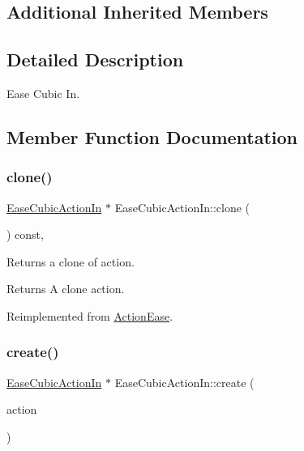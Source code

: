 \subsection*{Additional Inherited Members}


\subsection{Detailed Description}
Ease Cubic In. 

\subsection{Member Function Documentation}
\mbox{\label{classEaseCubicActionIn_a710f732cc78c6ef8d4697d4bd0021b3e}} 
\subsubsection{\texorpdfstring{clone()}{clone()}}
{\footnotesize\ttfamily \hyperlink{classEaseCubicActionIn}{Ease\+Cubic\+Action\+In} $\ast$ Ease\+Cubic\+Action\+In\+::clone (\begin{DoxyParamCaption}\item[{void}]{ }\end{DoxyParamCaption}) const\hspace{0.3cm}{\ttfamily [override]}, {\ttfamily [virtual]}}

Returns a clone of action.

\begin{DoxyReturn}{Returns}
A clone action. 
\end{DoxyReturn}


Reimplemented from \hyperlink{classActionEase_a39bec93fe161fb732a74d8e51a2fe08b}{Action\+Ease}.

\mbox{\label{classEaseCubicActionIn_a6e262f37b03a5485646976f415658005}} 
\subsubsection{\texorpdfstring{create()}{create()}}
{\footnotesize\ttfamily \hyperlink{classEaseCubicActionIn}{Ease\+Cubic\+Action\+In} $\ast$ Ease\+Cubic\+Action\+In\+::create (\begin{DoxyParamCaption}\item[{\hyperlink{classActionInterval}{Action\+Interval} $\ast$}]{action }\end{DoxyParamCaption})\hspace{0.3cm}{\ttfamily [static]}}



